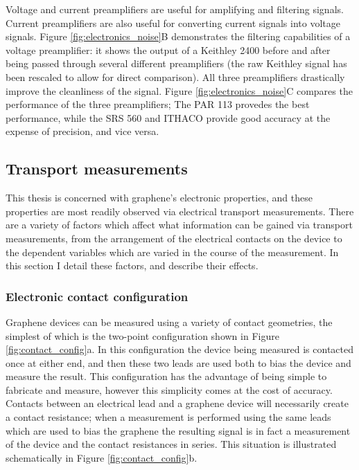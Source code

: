 \documentclass[edeposit,fullpage,draftthesis]{uiucthesis2009}
\begin{document}
            Voltage and current preamplifiers are useful for amplifying and filtering signals. Current
            preamplifiers are also useful for converting current signals into voltage signals.
            Figure \ref{fig:electronics_noise}B demonstrates the filtering capabilities of 
            a voltage preamplifier: it shows the output of a Keithley 2400 before and after
            being passed through several different preamplifiers (the raw Keithley signal has been
            rescaled to allow for direct comparison). All three preamplifiers drastically improve
            the cleanliness of the signal. Figure \ref{fig:electronics_noise}C compares the performance
            of the three preamplifiers; The PAR 113 provedes the best performance, while the 
            SRS 560 and ITHACO provide good accuracy at the expense of precision, and vice versa.
            
            
            
       
        
        \subsection{Transport measurements}
        
        This thesis is concerned with graphene's electronic properties, and these properties are most 
        readily observed via electrical transport measurements. There are a variety of factors which 
        affect what information can be gained via transport measurements,
        from the arrangement of the electrical contacts on the device to the dependent variables which 
        are varied in the course of the measurement. In this section I detail these factors, and describe
        their effects.
        
        \subsubsection*{Electronic contact configuration}
        
            Graphene devices can be measured using a variety of contact geometries, the simplest of which
            is the two-point configuration shown in Figure \ref{fig:contact_config}a. In this configuration
            the device being measured is contacted once at either end, and then these two leads are used both
            to bias the device and measure the result. This configuration has the advantage of being simple
            to fabricate and measure, however this simplicity comes at the cost of accuracy. Contacts between
            an electrical lead and a graphene device will necessarily create a contact resistance; when a 
            measurement is performed using the same leads which are used to bias the graphene the resulting
            signal is in fact a measurement of the device and the contact resistances in series. This situation
            is illustrated schematically in Figure \ref{fig:contact_config}b.
            
\end{document}
